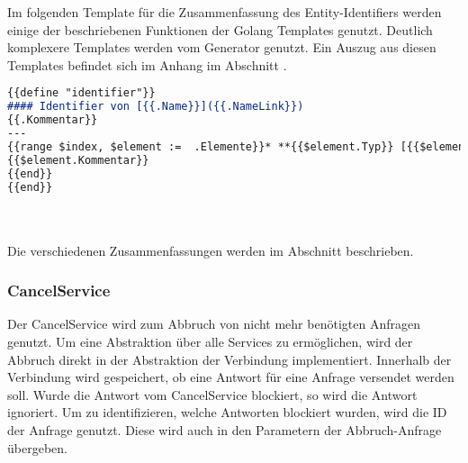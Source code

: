 \documentclass[./einleitung.tex]{subfiles}
\begin{document}
    Im folgenden Template für die Zusammenfassung des Entity-Identifiers werden einige der beschriebenen Funktionen der Golang Templates genutzt.
    Deutlich komplexere Templates werden vom Generator genutzt.
    Ein Auszug aus diesen Templates befindet sich im Anhang im Abschnitt .
    \begin{lstlisting}[language=markdown, caption=Template der Zusammenfassung des Entity-Identifiers]
{{define "identifier"}}
#### Identifier von [{{.Name}}]({{.NameLink}})
{{.Kommentar}}
---
{{range $index, $element :=  .Elemente}}* **{{$element.Typ}} [{{$element.Name}}]({{$element.Link}})**
{{$element.Kommentar}}
{{end}}
{{end}}
    \end{lstlisting}
    \\\\
    Die verschiedenen Zusammenfassungen werden im Abschnitt  beschrieben.

    \subsubsection[CancelService]{CancelService }\label{subsubsec:cancel-service}
    Der CancelService wird zum Abbruch von nicht mehr benötigten Anfragen genutzt.
    Um eine Abstraktion über alle Services zu ermöglichen, wird der Abbruch direkt in der Abstraktion der Verbindung implementiert.
    Innerhalb der Verbindung wird gespeichert, ob eine Antwort für eine Anfrage versendet werden soll.
    Wurde die Antwort vom CancelService blockiert, so wird die Antwort ignoriert.
    Um zu identifizieren, welche Antworten blockiert wurden, wird die ID der Anfrage genutzt.
    Diese wird auch in den Parametern der Abbruch-Anfrage übergeben.
\end{document}
